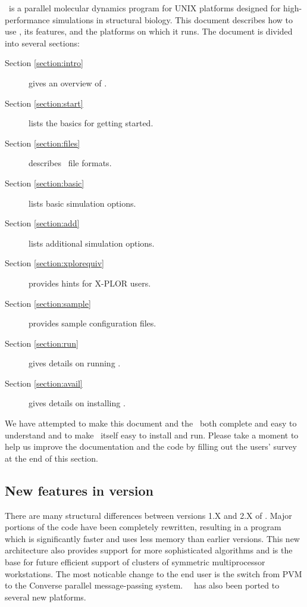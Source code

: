 \NAMD\ is a parallel molecular dynamics program for UNIX 
platforms designed for high-performance 
simulations in structural biology.  This document describes how to use 
\NAMD, its features, and the platforms on which it runs.
The document is divided into several sections:
\begin{description}
\item[Section \ref{section:intro}] gives an overview of \NAMD.
\item[Section \ref{section:start}] lists the basics for getting started.
\item[Section \ref{section:files}] describes \NAMD\ file formats.
\item[Section \ref{section:basic}] lists basic simulation options.
\item[Section \ref{section:add}] lists additional simulation options.
\item[Section \ref{section:xplorequiv}] provides hints for X-PLOR users.
\item[Section \ref{section:sample}] provides sample configuration files.
\item[Section \ref{section:run}] gives details on running \NAMD.
\item[Section \ref{section:avail}] gives details on installing \NAMD.
\end{description}

We have attempted to make this document and the \PG\ both
complete and easy to understand and to make \NAMD\ itself
easy to install and run.  Please take a moment to help us improve
the documentation and the code by filling out the users' survey
at the end of this section.

\subsection{New features in version \NAMDVER}

There are many structural differences between versions 1.X and 2.X of \NAMD.
Major portions of the code have been completely rewritten, resulting in a program which is significantly faster and uses less memory than earlier versions.
This new architecture also provides support for more sophisticated algorithms and is the base for future efficient support of clusters of symmetric multiprocessor workstations.
The most noticable change to the end user is the switch from PVM to the Converse parallel message-passing system.
\NAMD\ \NAMDVER\ has also been ported to several new platforms.

